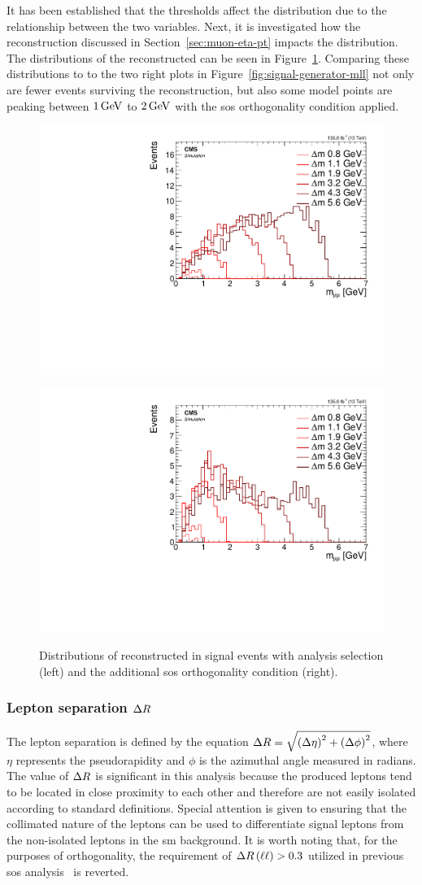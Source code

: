 It has been established that the \pt thresholds affect the \mll distribution due to the relationship between the two variables. Next, it is investigated how the reconstruction discussed in Section~\ref{sec:muon-eta-pt} impacts the \mmumu distribution. The distributions of the reconstructed \mmumu can be seen in Figure~\ref{fig:reco-signal-invamass}. Comparing these distributions to to the two right plots in Figure~\ref{fig:signal-generator-mll} not only are fewer events surviving the reconstruction, but also some \dm model points are peaking between $1 \,\text{Ge\hspace{-.08em}V}$ to $2 \,\text{Ge\hspace{-.08em}V}$ with the \gls{sos} orthogonality condition applied.

\begin{figure}[!htb]
\centering
\includegraphics[width=0.48\linewidth]{plots/signal_muons/none_invMassCorrJetNoMultIso10Dr0.6.pdf} \,
\includegraphics[width=0.48\linewidth]{plots/signal_muons/none_invMassCorrJetNoMultIso10Dr0.6_orth.pdf}  \\
\caption[Distributions of reconstructed \mmumu in signal events]{ Distributions of reconstructed \mmumu in signal events with analysis selection (left) and the additional \gls{sos} orthogonality condition (right).}
\label{fig:reco-signal-invamass}
\end{figure}

\subsubsection{Lepton separation $\Delta R$}
\label{sec:lepton-dr}

The lepton separation is defined by the equation $\Delta R=\sqrt{\left(\Delta\eta\right)^2+\left(\Delta\phi\right)^2}$, where $\eta$ represents the pseudorapidity and $\phi$ is the azimuthal angle measured in radians. The value of $\Delta R$ is significant in this analysis because the produced leptons tend to be located in close proximity to each other and therefore are not easily isolated according to standard definitions. Special attention is given to ensuring that the collimated nature of the leptons can be used to differentiate signal leptons from the non-isolated leptons in the \gls{sm} background. It is worth noting that, for the purposes of orthogonality, the requirement of $\Delta R\left(\ell\ell\right) > 0.3$ utilized in previous \gls{sos} analysis~\citep{sos} is reverted.

